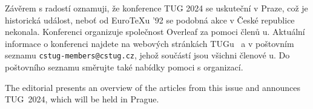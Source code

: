 \documentclass{csbulletin}
\begin{document}
Závěrem s radostí oznamuji, že konference TUG 2024 se uskuteční v Praze, což je historická událost, neboť od Euro\TeX u '92 se podobná akce v České republice nekonala. Konferenci organizuje společnost Overleaf za pomoci členů \CSTUG u. Aktuální informace o konferenci najdete na webových stránkách TUGu~\cite{tug2023tug} a v poštovním seznamu \texttt{cstug-members@cstug.cz}, jehož součástí jsou všichni členové \CSTUG u. Do poštovního seznamu směrujte také nabídky pomoci s organizací.

\printbibliography
 
\begin{summary}
The editorial presents an overview of the articles from this issue and announces TUG~2024, which will be held in Prague.
\end{summary}
\end{document}
